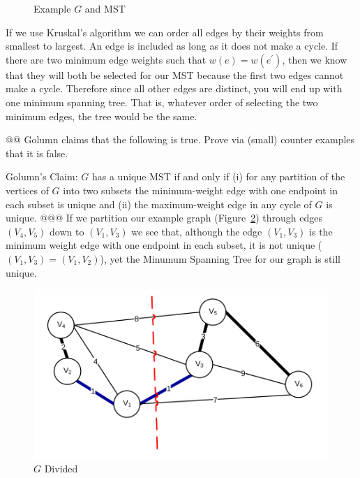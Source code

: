\documentclass[10pt]{article}\usepackage[]{graphicx}\usepackage[]{xcolor}
\newenvironment{knitrout}{}{} %
\begin{document}
\begin{easylist}[enumerate]
\begin{knitrout}
\begin{figure}[H]
{{}

}\caption[Example $G$ and MST]{Example $G$ and MST\label{fig:ps8.3a} }
\end{figure}


\end{knitrout}


    If we use Kruskal's algorithm we can order all edges by their weights from smallest to largest. An edge is included
    as long as it does not make a cycle. If there are two minimum edge weights such that $w(e) = w(e^\prime)$, then we
    know that they will both be selected for our MST because the first two edges cannot make a cycle. Therefore since
    all other edges are distinct, you will end up with one minimum spanning tree. That is, whatever order of selecting
    the two minimum edges, the tree would be the same.

    @@ Golumn claims that the following is true. Prove via (small) counter examples that it is false.

    Golumn's Claim: $G$ has a unique MST if and only if (i) for any partition of the vertices of $G$ into two subsets
    the minimum-weight edge with one endpoint in each subset is unique and (ii) the maximum-weight edge in any cycle of
    $G$ is unique.
    @@@ If we partition our example graph (Figure~\ref{fig:3ba}) through edges $(V_4 , V_5)$ down to $(V_1, V_3)$ we see
    that, although the edge $(V_1, V_3)$ is the minimum weight edge with one endpoint in each subset, it is not unique
    ($(V_1 , V_3) = (V_1, V_2)$), yet the Minumum Spanning Tree for our graph is still unique.

    \begin{figure}[H]
        \centering
        \includegraphics[scale=0.5]{./img/ps8/3b1.png}
        \caption{$G$ Divided}
        \label{fig:3ba}
    \end{figure}


\end{easylist}
\end{document}
